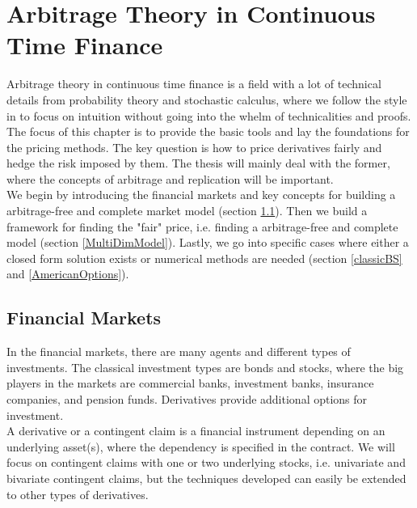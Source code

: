 
\chapter{Arbitrage Theory in Continuous Time Finance} %

\label{Chapter2} %

Arbitrage theory in continuous time finance is a field with a lot of technical details from probability theory and stochastic calculus, where we follow the style in \parencite{Hull, finKont} to focus on intuition without going into the whelm of technicalities and proofs. The focus of this chapter is to provide the basic tools and lay the foundations for the pricing methods. The key question is how to price derivatives fairly and hedge the risk imposed by them. The thesis will mainly deal with the former, where the concepts of arbitrage and replication will be important.\\

We begin by introducing the financial markets and key concepts for building a arbitrage-free and complete market model (section \ref{FinMarket}). Then we build a framework for finding the "fair" price, i.e. finding a arbitrage-free and complete model (section \ref{MultiDimModel}). Lastly, we go into specific cases where either a closed form solution exists or numerical methods are needed (section \ref{classicBS} and \ref{AmericanOptions}).


\section{Financial Markets}\label{FinMarket}
In the financial markets, there are many agents and different types of investments. The classical investment types are bonds and stocks, where the big players in the markets are commercial banks, investment banks, insurance companies, and pension funds. Derivatives provide additional options for investment.\\

A derivative or a contingent claim is a financial instrument depending on an underlying asset(s), where the dependency is specified in the contract. We will focus on contingent claims with one or two underlying stocks, i.e. univariate and bivariate contingent claims, but the techniques developed can easily be extended to other types of derivatives. \\

